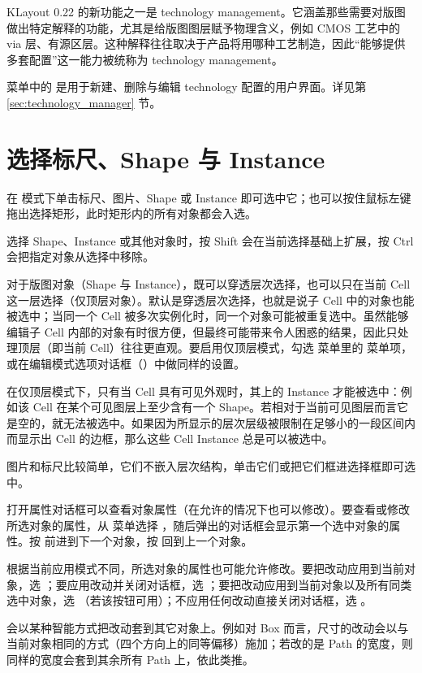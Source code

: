 KLayout 0.22 的新功能之一是 technology management。它涵盖那些需要对版图做出特定解释的功能，尤其是给版图图层赋予物理含义，例如 CMOS 工艺中的 via 层、有源区层。这种解释往往取决于产品将用哪种工艺制造，因此“能够提供多套配置”这一能力被统称为 technology management。

 菜单中的  是用于新建、删除与编辑 technology 配置的用户界面。详见第 \ref{sec:technology_manager} 节。

\section{选择标尺、Shape 与 Instance}\label{sec:selecting}

在  模式下单击标尺、图片、Shape 或 Instance 即可选中它；也可以按住鼠标左键拖出选择矩形，此时矩形内的所有对象都会入选。

选择 Shape、Instance 或其他对象时，按 Shift 会在当前选择基础上扩展，按 Ctrl 会把指定对象从选择中移除。

对于版图对象（Shape 与 Instance），既可以穿透层次选择，也可以只在当前 Cell 这一层选择（仅顶层对象）。默认是穿透层次选择，也就是说子 Cell 中的对象也能被选中；当同一个 Cell 被多次实例化时，同一个对象可能被重复选中。虽然能够编辑子 Cell 内部的对象有时很方便，但最终可能带来令人困惑的结果，因此只处理顶层（即当前 Cell）往往更直观。要启用仅顶层模式，勾选  菜单里的  菜单项，或在编辑模式选项对话框（）中做同样的设置。

在仅顶层模式下，只有当 Cell 具有可见外观时，其上的 Instance 才能被选中：例如该 Cell 在某个可见图层上至少含有一个 Shape。若相对于当前可见图层而言它是空的，就无法被选中。如果因为所显示的层次层级被限制在足够小的一段区间内而显示出 Cell 的边框，那么这些 Cell Instance 总是可以被选中。

图片和标尺比较简单，它们不嵌入层次结构，单击它们或把它们框进选择框即可选中。

打开属性对话框可以查看对象属性（在允许的情况下也可以修改）。要查看或修改所选对象的属性，从  菜单选择 ，随后弹出的对话框会显示第一个选中对象的属性。按  前进到下一个对象，按  回到上一个对象。

根据当前应用模式不同，所选对象的属性也可能允许修改。要把改动应用到当前对象，选 ；要应用改动并关闭对话框，选 ；要把改动应用到当前对象以及所有同类选中对象，选 （若该按钮可用）；不应用任何改动直接关闭对话框，选 。

 会以某种智能方式把改动套到其它对象上。例如对 Box 而言，尺寸的改动会以与当前对象相同的方式（四个方向上的同等偏移）施加；若改的是 Path 的宽度，则同样的宽度会套到其余所有 Path 上，依此类推。


